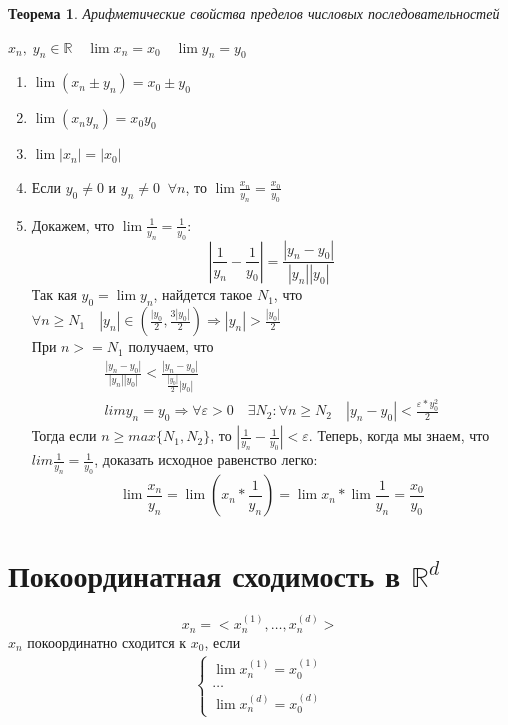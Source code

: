 \documentclass[12pt,letterpaper]{report}
\makeatletter
\newtheorem*{theorem-non}{Теорема}
\theoremstyle{definition}
\renewenvironment{proof}[1][\proofname]{%
   \par\pushQED{\qed}\normalfont%
   \topsep6\p@\@plus6\p@\relax
   \trivlist\item[\hskip\labelsep\bfseries#1\@addpunct{.}]%
   \ignorespaces
}{%
   \popQED\endtrivlist\@endpefalse
}
\makeatother
\begin{document}
    \begin{theorem-non} Арифметические свойства пределов числовых последовательностей \end{theorem-non}
    $x_n,\; y_n \in \mathbb{R} \quad \lim x_n = x_0 \quad \lim y_n = y_0$
    \begin{enumerate}
        \item $\lim (x_n \pm y_n) = x_0 \pm y_0$
        \item $\lim (x_ny_n) = x_0y_0$
        \item $\lim |x_n| = |x_0|$
        \item Если $y_0 \neq 0$ и $y_n \neq 0\;\; \forall n$, то $\lim \frac{x_n}{y_n} = \frac{x_0}{y_0}$
        \begin{proof}
            Докажем, что $\lim\frac{1}{y_n} = \frac{1}{y_0}$:
            \[ | \frac{1}{y_n} - \frac{1}{y_0} | = \frac{|y_n - y_0|}{|y_n||y_0|} \]
            Так кая $y_0 = \lim y_n$, найдется такое $N_1$, что $\forall n \geqslant N_1 \quad |y_n| \in (\frac{|y_0}{2}, \frac{3|y_0|}{2}) \Rightarrow |y_n| > \frac{|y_0|}{2}$ \\
            При $n >= N_1$ получаем, что
            \begin{gather*}
                \frac{|y_n - y_0|}{|y_n||y_0|} < \frac{|y_n - y_0|}{\frac{|y_0|}{2}|y_0|} \\
                lim y_n = y_0 \Rightarrow \forall \varepsilon > 0 \quad \exists N_2 : \forall n \geqslant N_2 \quad |y_n - y_0| < \frac{\varepsilon*y_0^2}{2}
            \end{gather*}
            Тогда если $n \geqslant max\{N_1, N_2\}$, то $|\frac{1}{y_n} - \frac{1}{y_0}| < \varepsilon$.
            Теперь, когда мы знаем, что $lim\frac{1}{y_n} = \frac{1}{y_0}$, доказать исходное равенство легко:
            \[ \lim \frac{x_n}{y_n} = \lim (x_n * \frac{1}{y_n}) = \lim x_n * \lim \frac{1}{y_n} = \frac{x_0}{y_0} \]
        \end{proof}
    \end{enumerate}
    
    \section{Покоординатная сходимость в $\mathbb{R}^d$}
    \[ x_n = <x_n^{(1)}, \dots, x_n^{(d)}> \]
    $x_n$ покоординатно сходится к $x_0$, если \\
    \begin{gather*}
        \begin{cases}
            \lim x_n^{(1)} = x_0^{(1)} \\
            \dots \\
            \lim x_n^{(d)} = x_0^{(d)}
        \end{cases}
    \end{gather*}
    
\end{document}
